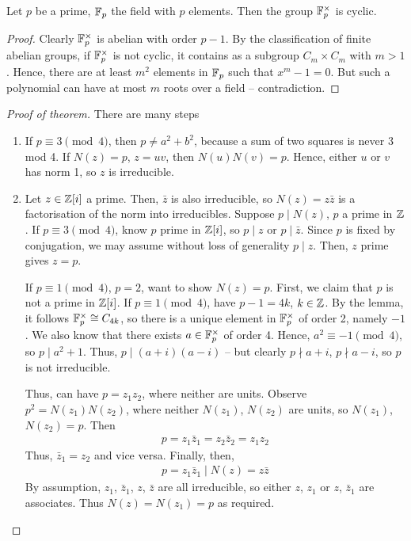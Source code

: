 \documentclass{../template/note}
\begin{document}
    \begin{lemma}
        Let $p$ be a prime, $\mathbb F_p$ the field with $p$ elements. Then the group $\mathbb F_p^\times$ is cyclic.
    \end{lemma}
    
    \begin{proof}
        Clearly $\mathbb F_p^\times$ is abelian with order $p-1$. By the classification of finite abelian groups, if $\mathbb F_p^\times$ is not cyclic, it contains as a subgroup $C_m \times C_m$ with $m > 1$. Hence, there are at least $m^2$ elements in $\mathbb F_p$ such that $x^m - 1 = 0$. But such a polynomial can have at most $m$ roots over a field -- contradiction.
    \end{proof}
    
    \begin{proof}[Proof of theorem]
        There are many steps
        \begin{enumerate}
            \item[$\impliedby$] If $p \equiv 3 \pmod 4$, then $p \neq a^2 + b^2$, because a sum of two squares is never 3 mod 4. If $N(z) = p$, $z=uv$, then $N(u)N(v) = p$. Hence, either $u$ or $v$ has norm 1, so $z$ is irreducible.
            \item[$\implies$] Let $z \in \mathbb Z[i]$ a prime. Then, $\bar z$ is also irreducible, so $N(z) = z\bar z$ is a factorisation of the norm into irreducibles. Suppose $p \mid N(z)$, $p$ a prime in $\mathbb Z$. If $p \equiv 3 \pmod 4$, know $p$ prime in $\mathbb Z[i]$, so $p \mid z$ or $p \mid \bar z$. Since $p$ is fixed by conjugation, we may assume without loss of generality $p \mid z$. Then, $z$ prime gives $z=p$.
            
            If $p \equiv 1 \pmod 4$, $p=2$, want to show $N(z) = p$. First, we claim that $p$ is not a prime in $\mathbb Z[i]$. If $p \equiv 1 \pmod 4$, have $p-1 = 4k$, $k \in \mathbb Z$. By the lemma, it follows $\mathbb F_p^\times \cong C_{4k}$, so there is a unique element in $\mathbb F_p^\times$ of order 2, namely $-1$. We also know that there exists $a \in \mathbb F_p^\times$ of order 4. Hence, $a^2 \equiv -1 \pmod 4$, so $p \mid a^2+1$. Thus, $p \mid (a+i)(a-i)$ -- but clearly $p \nmid a+i$, $p \nmid a-i$, so $p$ is not irreducible.

            Thus, can have $p = z_1z_2$, where neither are units. Observe $p^2 = N(z_1)N(z_2)$, where neither $N(z_1)$, $N(z_2)$ are units, so $N(z_1)$, $N(z_2) = p$. Then
            \begin{align*}
                p = z_1 \bar z_1 = z_2 \bar z_2 = z_1 z_2
            \end{align*}
            Thus, $\bar z_1 = z_2$ and vice versa. Finally, then, 
            \begin{align*}
                p = z_1 \bar z_1 \mid N(z) = z \bar z
            \end{align*}
            By assumption, $z_1$, $\bar z_1$, $z$, $\bar z$ are all irreducible, so either $z$, $z_1$ or $z$, $\bar z_1$ are associates. Thus $N(z) = N(z_1) = p$ as required.         
        \end{enumerate}
    \end{proof}
    
\end{document}
